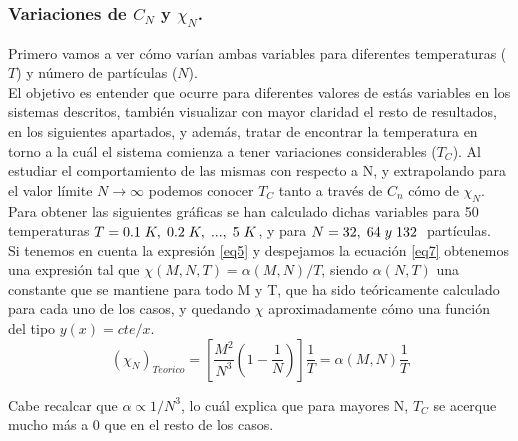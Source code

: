 \documentclass[12pt,paper]{article}
\begin{document}
\subsubsection{Variaciones de $C_N$ y $\chi_N$.}
Primero vamos a ver cómo varían ambas variables para diferentes temperaturas ($T$) y número de partículas ($N$).\\

El objetivo es entender que ocurre para diferentes valores de estás variables en los sistemas descritos, también visualizar con mayor claridad el resto de resultados, en los siguientes apartados, y además, tratar de encontrar la temperatura en torno a la cuál el sistema comienza a tener variaciones considerables ($T_C$). Al estudiar el comportamiento de las mismas con respecto a N, y extrapolando para el valor límite $N \rightarrow \infty$ podemos conocer $T_C$ tanto a través de $C_n$ cómo de $\chi_N$.\\

Para obtener las siguientes gráficas se han calculado dichas variables para 50 temperaturas $T = 0.1 \hspace{1mm} K, \hspace{1mm} 0.2 \hspace{1mm} K, \hspace{1mm} ..., \hspace{1mm} 5 \hspace{1mm}K$, y para $N = 32, \hspace{1mm} 64 \hspace{1mm} y \hspace{1mm} 132 \hspace{1mm}$ partículas.\\

Si tenemos en cuenta la expresión \ref{eq5} y despejamos la ecuación \ref{eq7} obtenemos una expresión tal que $\chi(M,N,T) = \alpha(M,N)/T$, siendo $\alpha(N,T)$ una constante que se mantiene para todo M y T, que ha sido teóricamente calculado para cada uno de los casos, y quedando $\chi$ aproximadamente cómo una función del tipo $y(x) = cte/x$.\\
\begin{equation}
    (\chi_N)_{Teorico} = [\frac{M^2}{N^3} (1- \frac{1}{N})] \frac{1}{T} = \alpha(M,N) \frac{1}{T}
\end{equation}

Cabe recalcar que $\alpha \propto 1/N^3$, lo cuál explica que para mayores N, $T_C$ se acerque mucho más a 0 que en el resto de los casos.\\
\end{document}
